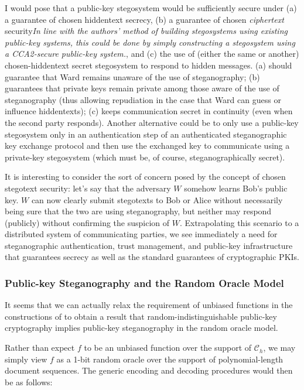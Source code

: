 \documentclass{article}
\begin{document}
I would pose that a public-key stegosystem would be sufficiently secure under (a) a guarantee of chosen hiddentext secrecy, (b) a guarantee 
of chosen \textit{ciphertext} security\textit{In line with the authors' method of building stegosystems using existing public-key systems, 
this could be done by simply constructing a stegosystem using a CCA2-secure public-key system.}, and (c) the use of (either the same or another) chosen-hiddentext secret stegosystem to respond to hidden messages.  (a) should guarantee that Ward remains unaware of the use of steganography; (b) guarantees that private keys remain private among those aware of the use of steganography (thus allowing repudiation in the case that Ward can guess or influence hiddentexts); (c) keeps communication secret in continuity (even when the second party responds).  Another alternative could be 
to only use a public-key stegosystem only in an authentication step of an authenticated steganographic key exchange protocol and then use the exchanged key 
to communicate using a private-key stegosystem (which must be, of course, steganographically secret).

It is interesting to consider the sort of concern posed by the concept of chosen stegotext security: let's say that the adversary $W$ somehow learns 
Bob's public key.  $W$ can now clearly submit stegotexts to Bob or Alice without necessarily being sure that the two are using steganography, but 
neither may respond (publicly) without confirming the suspicion of $W$.  Extrapolating this scenario to a distributed system of communicating parties, 
we see immediately a need for steganographic authentication, trust management, and public-key infrastructure that guarantees secrecy as well as the 
standard guarantees of cryptographic PKIs.

\subsubsection{Public-key Steganography and the Random Oracle Model}

It seems that we can actually relax the requirement of unbiased functions in the constructions of \cite{BiglouPubKey} to obtain a result 
that random-indistinguishable public-key cryptography implies public-key steganography in the random oracle model.

Rather than expect $f$ to be an unbiased function over the support of $\mathcal{C}_h$, we may simply view $f$ as a 1-bit random oracle 
over the support of polynomial-length document sequences.  The generic encoding and decoding procedures would then be as follows:
\end{document}
